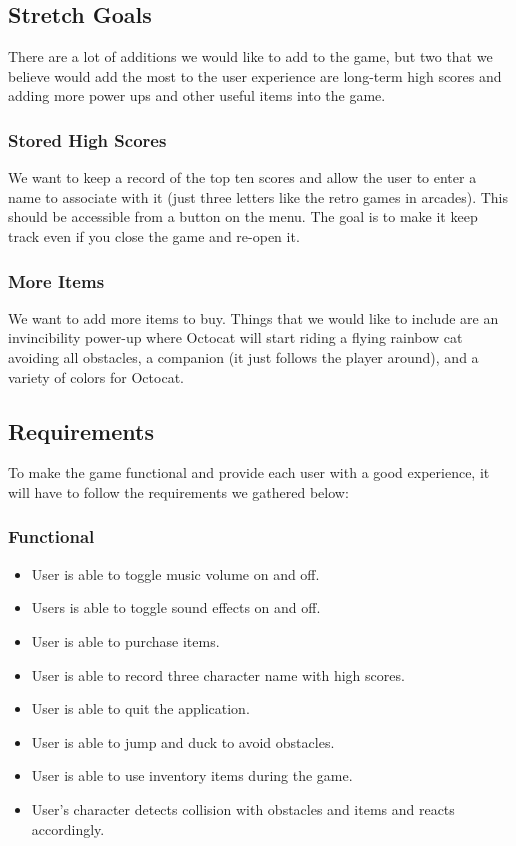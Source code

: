 \documentclass[10pt,conference,onecolumn,compsoc]{IEEEtran}
\begin{document}
\subsection{Stretch Goals}
There are a lot of additions we would like to add to the game, but two that we believe would add the most to the user experience are long-term high scores and adding more power ups and other useful items into the game.

\subsubsection{Stored High Scores}
We want to keep a record of the top ten scores and allow the user to enter a name to associate with it (just three letters like the retro games in arcades). This should be accessible from a button on the menu. The goal is to make it keep track even if you close the game and re-open it.

\subsubsection{More Items} We want to add more items to buy. Things that we would like to include are an invincibility power-up where Octocat will start riding a flying rainbow cat avoiding all obstacles, a companion (it just follows the player around), and a variety of colors for Octocat.

\subsection{Requirements}
To make the game functional and provide each user with a good experience, it will have to follow the requirements we gathered below:

\subsubsection{Functional}
\begin{itemize}
\item User is able to toggle music volume on and off.
\item Users is able to toggle sound effects on and off.
\item User is able to purchase items.
\item User is able to record three character name with high scores.
\item User is able to quit the application.
\item User is able to jump and duck to avoid obstacles.
\item User is able to use inventory items during the game.
\item User's character detects collision with obstacles and items and reacts accordingly.
\end{itemize}
\end{document}
